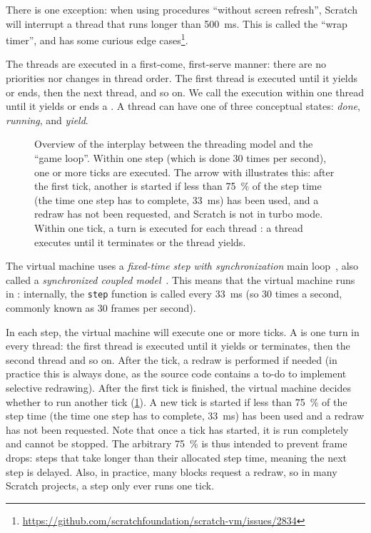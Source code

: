 \documentclass[../main]{subfiles}
\begin{document}
There is one exception: when using procedures ``without screen refresh'', Scratch will interrupt a thread that runs longer than \qty{500}{\milli\second}.
This is called the ``wrap timer'', and has some curious edge cases\footnote{\url{https://github.com/scratchfoundation/scratch-vm/issues/2834}}.

The threads are executed in a first-come, first-serve manner: there are no priorities nor changes in thread order.
The first thread is executed until it yields or ends, then the next thread, and so on.
We call the execution within one thread until it yields or ends a .
A thread can have one of three conceptual states: \emph{done}, \emph{running}, and \emph{yield}.

\begin{figure}
    \centering
    
    \caption{Overview of the interplay between the threading model and the ``game loop''. Within one step (which is done 30 times per second), one or more ticks are executed. The arrow with  illustrates this: after the first tick, another is started if less than \qty{75}{\percent} of the step time (the time one step has to complete, \qty{33}{\milli\second}) has been used, and a redraw has not been requested, and Scratch is not in turbo mode. Within one tick, a turn is executed for each thread : a thread executes until it terminates or the thread yields.}
    \label{fig:scratch-model-explained}
\end{figure}

The virtual machine uses a \emph{fixed-time step with synchronization} main loop~\autocite{nystromGameProgrammingPatterns2014}, also called a \emph{synchronized coupled model}~\autocite{valenteRealTimeGame2005}.
This means that the virtual machine runs in : internally, the \texttt{step} function is called every \qty{33}{\milli\second} (so 30 times a second, commonly known as 30 frames per second).

In each step, the virtual machine will execute one or more ticks.
A  is one turn in every thread: the first thread is executed until it yields or terminates, then the second thread and so on.
After the tick, a redraw is performed if needed (in practice this is always done, as the source code contains a to-do to implement selective redrawing).
After the first tick is finished, the virtual machine decides whether to run another tick (\cref{fig:scratch-model-explained}).
A new tick is started if less than \qty{75}{\percent} of the step time (the time one step has to complete, \qty{33}{\milli\second}) has been used and a redraw has not been requested.
Note that once a tick has started, it is run completely and cannot be stopped.
The arbitrary \qty{75}{\percent} is thus intended to prevent frame drops: steps that take longer than their allocated step time, meaning the next step is delayed.
Also, in practice, many blocks request a redraw, so in many Scratch projects, a step only ever runs one tick.
\end{document}

